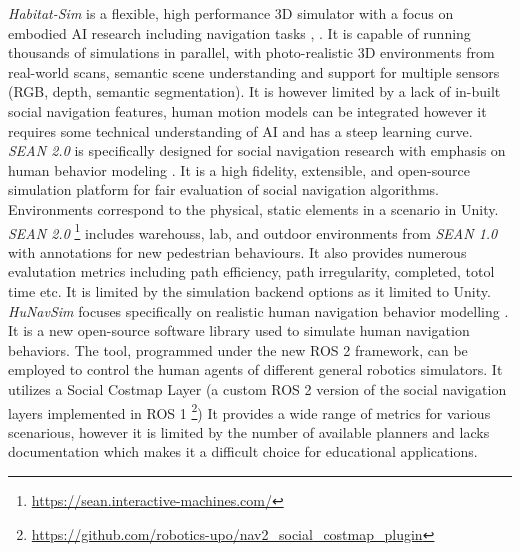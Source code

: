 \textit{Habitat-Sim} is a flexible, high performance 3D simulator with a focus on embodied AI 
research including navigation tasks \cite{habitat}, \cite{szot2022habitat20traininghome}. 
It is capable of running thousands of simulations in parallel, with photo-realistic 3D 
environments from real-world scans, semantic scene understanding and support for multiple 
sensors (RGB, depth, semantic segmentation). It is however limited by a lack of in-built 
social navigation features, human motion models can be integrated however it requires some
technical understanding of AI and has a steep learning curve. \\

\textit{SEAN 2.0} is specifically designed for social navigation research with emphasis on 
human behavior modeling \cite{tsoi2022sean2}. It is a high fidelity, extensible, and open-source simulation platform for fair evaluation of social navigation algorithms. 
Environments correspond to the physical, static elements in a scenario in Unity. \textit{SEAN 2.0}
\footnote{\href{https://sean.interactive-machines.com/}{https://sean.interactive-machines.com/}}
includes warehouss, lab, and outdoor environments from \textit{SEAN 1.0} with annotations 
for new pedestrian behaviours. It also provides numerous evalutation metrics including path 
efficiency, path irregularity, completed, totol time etc. It is limited by the simulation 
backend options as it limited to Unity.  \\

\textit{HuNavSim} focuses specifically on realistic human navigation behavior modelling \cite{hunavsimros2human}.
It is a new open-source software library used to simulate human navigation behaviors. The tool,
programmed under the new ROS 2 framework, can be employed to control the human agents of 
different general robotics simulators. It utilizes a Social Costmap Layer (a custom ROS 2 version 
of the social navigation layers implemented in ROS 1
\footnote{\href{https://github.com/robotics-upo/nav2_social_costmap_plugin}
{https://github.com/robotics-upo/nav2\_social\_costmap\_plugin}})
It provides a wide range of metrics for various scenarious, however it is limited by the number of 
available planners and lacks documentation which makes it a difficult choice for educational 
applications. \\

